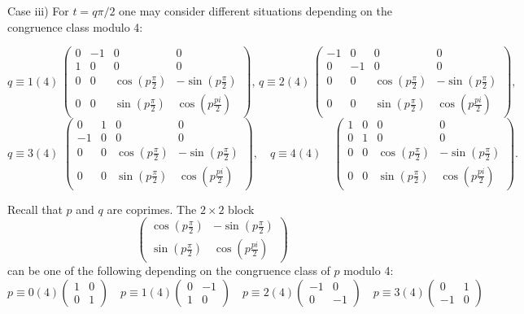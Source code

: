 \documentclass[11pt]{amsart}
\theoremstyle{plain}
\theoremstyle{definition}
\theoremstyle{remark}
\begin{document}
 
  Case iii)   For $t=q \pi/2$ one may consider different situations depending on the congruence class modulo 4:
   
  $$q\equiv 1(4) \, \left( \begin{matrix} 
  	0 & -1 & 0 & 0\\
  	1 & 0 &0 & 0\\
  	0 & 0 & \cos(p \frac{\pi}2) & -\sin(p\frac{\pi}2)\\
  	0 & 0 & \sin(p \frac{\pi}2) & \cos(p \frac{pi}2)
  \end{matrix}
  \right),\, q\equiv 2(4)\,\left( \begin{matrix} 
  	-1 & 0 & 0 & 0\\
  	0 & -1 & 0 & 0\\
  	0 & 0 & \cos(p \frac{\pi}2) & -\sin(p\frac{\pi}2)\\
  	0 & 0 & \sin(p \frac{\pi}2) & \cos(p \frac{pi}2)
  \end{matrix}
  \right),$$
  $$q\equiv 3(4) \, \,\left( \begin{matrix} 
  	0 & 1 & 0 & 0\\
  	-1 & 0 &0 & 0\\
  	0 & 0 & \cos(p \frac{\pi}2) & -\sin(p\frac{\pi}2)\\
  	0 & 0 & \sin(p \frac{\pi}2) & \cos(p \frac{pi}2)
  \end{matrix}
  \right), \quad q\equiv 4(4) \quad \left( \begin{matrix} 
  	1 & 0 & 0 & 0\\
  	0 & 1 &0 & 0\\
  	0 & 0 &  \cos(p \frac{\pi}2) & -\sin(p\frac{\pi}2)\\
  	0 & 0 & \sin(p \frac{\pi}2) & \cos(p \frac{pi}2)
  \end{matrix}
  \right). 
  $$
  
 Recall that  $p$ and $q$ are coprimes. The $2\times 2$ block
 $$\left( \begin{matrix}
 	 \cos(p \frac{\pi}2) & -\sin(p\frac{\pi}2)\\
 \sin(p \frac{\pi}2) & \cos(p \frac{pi}2)
 \end{matrix}
\right)$$
can be one of the following depending on the congruence class of $p$ modulo 4:
$$p\equiv 0(4) \left( \begin{matrix} 
	1 & 0 \\
	0 & 1 \end{matrix}\right)\quad p\equiv 1(4) \left( \begin{matrix} 
	0 & -1 \\
	1 & 0 \end{matrix}\right)\quad p\equiv 2(4) \left( \begin{matrix} 
	-1 & 0 \\
	0 & -1\end{matrix}\right)
  \quad p\equiv 3(4) \left( \begin{matrix} 
  0 & 1 \\
  	-1 &0 \end{matrix}\right)$$
  
\end{document}
